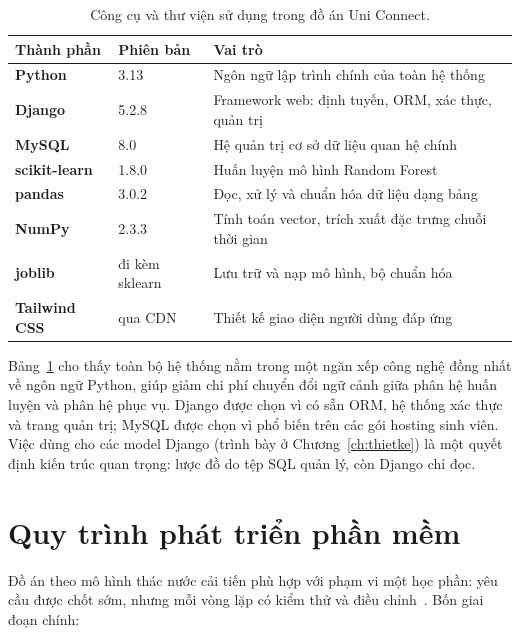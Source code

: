 \begin{table}[H]
\centering
\caption{Công cụ và thư viện sử dụng trong đồ án Uni Connect.}
\label{tab:congcu}
\begin{tabularx}{\textwidth}{>{\bfseries\color{daunavy}}l >{\color{daumaroon}}l >{\raggedright\arraybackslash}X}
\toprule
\rowcolor{gray100}\bfseries\color{daunavy}Thành phần & \bfseries\color{daumaroon}Phiên bản & \bfseries\color{daunavy}Vai trò \\
\midrule
Python         & 3.13              & Ngôn ngữ lập trình chính của toàn hệ thống~\cite{VanderPlas2016} \\
Django         & 5.2.8             & Framework web: định tuyến, ORM, xác thực, quản trị~\cite{DjangoDocs} \\
MySQL          & 8.0               & Hệ quản trị cơ sở dữ liệu quan hệ chính~\cite{MySQLDocs} \\
scikit-learn   & 1.8.0             & Huấn luyện mô hình Random Forest~\cite{Pedregosa2011} \\
pandas         & 3.0.2             & Đọc, xử lý và chuẩn hóa dữ liệu dạng bảng~\cite{McKinney2017} \\
NumPy          & 2.3.3             & Tính toán vector, trích xuất đặc trưng chuỗi thời gian \\
joblib         & đi kèm sklearn    & Lưu trữ và nạp mô hình, bộ chuẩn hóa \\
Tailwind CSS   & qua CDN           & Thiết kế giao diện người dùng đáp ứng \\
\bottomrule
\end{tabularx}
\end{table}

Bảng~\ref{tab:congcu} cho thấy toàn bộ hệ thống nằm trong một ngăn xếp công
nghệ đồng nhất về ngôn ngữ Python, giúp giảm chi phí chuyển đổi ngữ cảnh giữa
phân hệ huấn luyện và phân hệ phục vụ. Django được chọn vì có sẵn ORM, hệ thống
xác thực và trang quản trị; MySQL được chọn vì phổ biến trên các gói hosting
sinh viên. Việc dùng  cho các model Django (trình bày ở
Chương~\ref{ch:thietke}) là một quyết định kiến trúc quan trọng: lược đồ do tệp
SQL quản lý, còn Django chỉ đọc.

\section{Quy trình phát triển phần mềm}

Đồ án theo mô hình thác nước cải tiến  phù hợp với
phạm vi một học phần: yêu cầu được chốt sớm, nhưng mỗi vòng lặp có kiểm thử và
điều chỉnh~\cite{Somerville2015}. Bốn giai đoạn chính:

